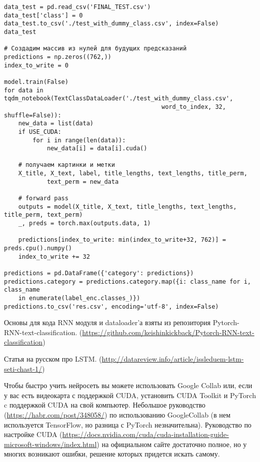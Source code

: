 \begin{verbatim}
data_test = pd.read_csv('FINAL_TEST.csv')
data_test['class'] = 0
data_test.to_csv('./test_with_dummy_class.csv', index=False)
data_test

# Создадим массив из нулей для будущих предсказаний
predictions = np.zeros((762,))
index_to_write = 0

model.train(False)
for data in tqdm_notebook(TextClassDataLoader('./test_with_dummy_class.csv', 
                                            word_to_index, 32, shuffle=False)):
    new_data = list(data)
    if USE_CUDA:
        for i in range(len(data)):
            new_data[i] = data[i].cuda()
                    
    # получаем картинки и метки
    X_title, X_text, label, title_lengths, text_lengths, title_perm, 
            text_perm = new_data

    # forward pass
    outputs = model(X_title, X_text, title_lengths, text_lengths, title_perm, text_perm)
    _, preds = torch.max(outputs.data, 1)
    
    predictions[index_to_write: min(index_to_write+32, 762)] = preds.cpu().numpy()
    index_to_write += 32

predictions = pd.DataFrame({'category': predictions})
predictions.category = predictions.category.map({i: class_name for i, class_name 
    in enumerate(label_enc.classes_)})
predictions.to_csv('res.csv', encoding='utf-8', index=False)

\end{verbatim}

Основы для кода RNN модуля и dataloader'а взяты из репозитория Pytorch-RNN-text-classification. (\url{https://github.com/keishinkickback/Pytorch-RNN-text-classification})

Статья на русском про LSTM. (\url{http://datareview.info/article/issleduem-lstm-seti-chast-1/})

Чтобы быстро учить нейросеть вы можете использовать Google Collab или, если у вас есть видеокарта с поддержкой CUDA, установить CUDA 
Toolkit и PyTorch c поддержкой CUDA на свой компьютер. Небольшое руководство (\url{https://habr.com/post/348058/}) по использованию 
GoogleCollab (в нем используется TensorFlow, но разница с PyTorch незначительна). Руководство по настройке CUDA (\url{https://docs.nvidia.com/cuda/cuda-installation-guide-microsoft-windows/index.html}) \linebreak на официальном сайте достаточно полное, но у многих возникают ошибки, решение которых придется искать самому.